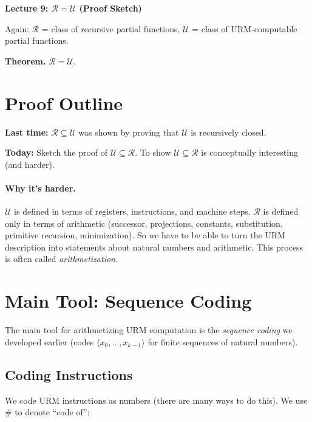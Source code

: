 \documentclass[11pt]{article}
\begin{document}
\newpage

{\LARGE\bfseries Lecture 9: $\mathcal{R} = \mathcal{U}$ (Proof Sketch)}

Again: $\mathcal{R}$ = class of recursive partial functions, $\mathcal{U}$ = class of URM-computable partial functions.

\textbf{Theorem.} $\mathcal{R} = \mathcal{U}$.

\section{Proof Outline}

\textbf{Last time:} $\mathcal{R} \subseteq \mathcal{U}$ was shown by proving that $\mathcal{U}$ is recursively closed.

\textbf{Today:} Sketch the proof of $\mathcal{U} \subseteq \mathcal{R}$. To show $\mathcal{U} \subseteq \mathcal{R}$ is conceptually interesting (and harder).

\paragraph{Why it's harder.} $\mathcal{U}$ is defined in terms of registers, instructions, and machine steps. $\mathcal{R}$ is defined only in terms of arithmetic (successor, projections, constants, substitution, primitive recursion, minimization). So we have to be able to turn the URM description into statements about natural numbers and arithmetic. This process is often called \emph{arithmetization}.

\section{Main Tool: Sequence Coding}

The main tool for arithmetizing URM computation is the \emph{sequence coding} we developed earlier (codes $\langle x_0, \dots, x_{k-1} \rangle$ for finite sequences of natural numbers).

\subsection{Coding Instructions}

We code URM instructions as numbers (there are many ways to do this). We use $\#$ to denote ``code of'':
\end{document}
